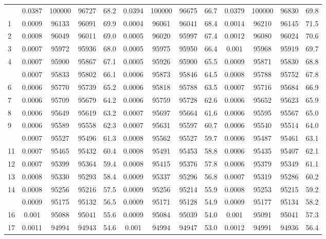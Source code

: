 \documentclass[
  14pt,
]{article}
\begin{document}
\begin{longtable}[t]{lcccccccccccc}
\endfoot
\bottomrule
\endlastfoot
0 & 0.0387 & 100000 & 96727 & 68.2 & 0.0394 & 100000 & 96675 & 66.7 & 0.0379 & 100000 & 96830 & 69.8\\
1 & 0.0009 & 96133 & 96091 & 69.9 & 0.0004 & 96061 & 96041 & 68.4 & 0.0014 & 96210 & 96145 & 71.5\\
2 & 0.0008 & 96049 & 96011 & 69.0 & 0.0005 & 96020 & 95997 & 67.4 & 0.0012 & 96080 & 96024 & 70.6\\
3 & 0.0007 & 95972 & 95936 & 68.0 & 0.0005 & 95975 & 95950 & 66.4 & 0.001 & 95968 & 95919 & 69.7\\
4 & 0.0007 & 95900 & 95867 & 67.1 & 0.0005 & 95926 & 95900 & 65.5 & 0.0009 & 95871 & 95830 & 68.8\\
\addlinespace
5 & 0.0007 & 95833 & 95802 & 66.1 & 0.0006 & 95873 & 95846 & 64.5 & 0.0008 & 95788 & 95752 & 67.8\\
6 & 0.0006 & 95770 & 95739 & 65.2 & 0.0006 & 95818 & 95788 & 63.5 & 0.0007 & 95716 & 95684 & 66.9\\
7 & 0.0006 & 95709 & 95679 & 64.2 & 0.0006 & 95759 & 95728 & 62.6 & 0.0006 & 95652 & 95623 & 65.9\\
8 & 0.0006 & 95649 & 95619 & 63.2 & 0.0007 & 95697 & 95664 & 61.6 & 0.0006 & 95595 & 95567 & 65.0\\
9 & 0.0006 & 95589 & 95558 & 62.3 & 0.0007 & 95631 & 95597 & 60.7 & 0.0006 & 95540 & 95514 & 64.0\\
\addlinespace
10 & 0.0007 & 95527 & 95496 & 61.3 & 0.0008 & 95562 & 95527 & 59.7 & 0.0006 & 95487 & 95461 & 63.1\\
11 & 0.0007 & 95465 & 95432 & 60.4 & 0.0008 & 95491 & 95453 & 58.8 & 0.0006 & 95435 & 95407 & 62.1\\
12 & 0.0007 & 95399 & 95364 & 59.4 & 0.0008 & 95415 & 95376 & 57.8 & 0.0006 & 95379 & 95349 & 61.1\\
13 & 0.0008 & 95330 & 95293 & 58.4 & 0.0009 & 95337 & 95296 & 56.8 & 0.0007 & 95319 & 95286 & 60.2\\
14 & 0.0008 & 95256 & 95216 & 57.5 & 0.0009 & 95256 & 95214 & 55.9 & 0.0008 & 95253 & 95215 & 59.2\\
\addlinespace
15 & 0.0009 & 95175 & 95132 & 56.5 & 0.0009 & 95171 & 95128 & 54.9 & 0.0009 & 95177 & 95134 & 58.2\\
16 & 0.001 & 95088 & 95041 & 55.6 & 0.0009 & 95084 & 95039 & 54.0 & 0.001 & 95091 & 95041 & 57.3\\
17 & 0.0011 & 94994 & 94943 & 54.6 & 0.001 & 94994 & 94947 & 53.0 & 0.0012 & 94991 & 94936 & 56.4\\

\end{longtable}
\end{document}
